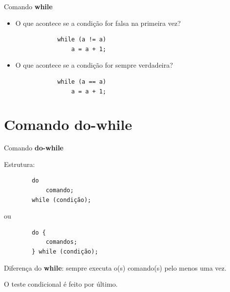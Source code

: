 \documentclass[handout]{beamer}
\begin{document}
\begin{frame}[fragile]{Comando {\bf while}}

    \begin{itemize}[<+->]
        \item O que acontece se a condição for falsa na primeira vez?
        \begin{verbatim}
            while (a != a)
                a = a + 1;
        \end{verbatim}

        \item O que acontece se a condição for sempre verdadeira?
        \begin{verbatim}
            while (a == a)
                a = a + 1;
        \end{verbatim}
    \end{itemize}
\end{frame}

\section{Comando {\bf do-while}}%

\begin{frame}[fragile]{Comando {\bf do-while}}

    Estrutura:
    \begin{verbatim}
        do
            comando;
        while (condição);
    \end{verbatim}

    ou

    \begin{verbatim}
        do {
            comandos;
        } while (condição);
    \end{verbatim}

    \pause
    Diferença do {\bf while}: sempre executa o(s) comando(s) pelo menos uma vez.

    O teste condicional é feito por último.
\end{frame}
\end{document}
